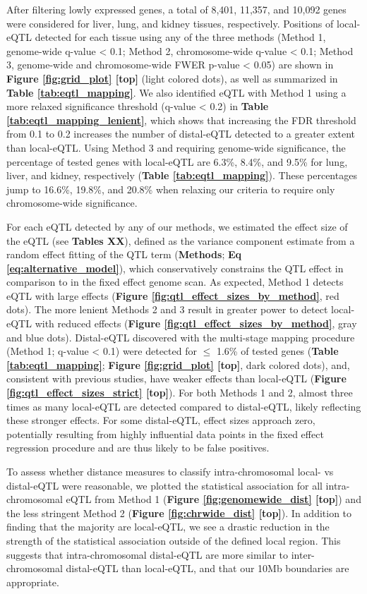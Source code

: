 After filtering lowly expressed genes, a total of 8,401, 11,357, and 10,092 genes were considered for liver, lung, and kidney tissues, respectively. Positions of local-eQTL detected for each tissue using any of the three methods (Method 1, genome-wide q-value < 0.1; Method 2, chromosome-wide q-value < 0.1; Method 3, genome-wide and chromosome-wide FWER p-value < 0.05)  are shown in \textbf{Figure \ref{fig:grid_plot} [top]} (light colored dots), as well as summarized in \textbf{Table \ref{tab:eqtl_mapping}}. We also identified eQTL with Method 1 using a more relaxed significance threshold (q-value < 0.2) in \textbf{Table \ref{tab:eqtl_mapping_lenient}}, which shows that increasing the FDR threshold from 0.1 to 0.2 increases the number of distal-eQTL detected to a greater extent than local-eQTL. Using Method 3 and requiring genome-wide significance, the percentage of tested genes with local-eQTL are 6.3\%, 8.4\%, and 9.5\% for lung, liver, and kidney, respectively (\textbf{Table \ref{tab:eqtl_mapping}}). These percentages jump to 16.6\%, 19.8\%, and 20.8\% when relaxing our criteria to require only chromosome-wide significance. 

For each eQTL detected by any of our methods, we estimated the effect size of the eQTL (see \textbf{Tables XX}), defined as the variance component estimate from a random effect fitting of the QTL term (\textbf{Methods}; \textbf{Eq \ref{eq:alternative_model}}), which conservatively constrains the QTL effect in comparison to in the fixed effect genome scan. As expected, Method 1 detects eQTL with large effects (\textbf{Figure \ref{fig:qtl_effect_sizes_by_method}}, red dots). The more lenient Methods 2 and 3 result in greater power to detect local-eQTL with reduced effects (\textbf{Figure \ref{fig:qtl_effect_sizes_by_method}}, gray and blue dots). Distal-eQTL discovered with the multi-stage mapping procedure (Method 1; q-value < 0.1) were detected for $\leq$ 1.6\% of tested genes (\textbf{Table \ref{tab:eqtl_mapping}}; \textbf{Figure \ref{fig:grid_plot} [top]}, dark colored dots), and, consistent with previous studies, have weaker effects than local-eQTL (\textbf{Figure \ref{fig:qtl_effect_sizes_strict} [top]}). For both Methods 1 and 2, almost three times as many local-eQTL are detected compared to distal-eQTL, likely reflecting these stronger effects. For some distal-eQTL, effect sizes approach zero, potentially resulting from highly influential data points in the fixed effect regression procedure and are thus likely to be false positives. 

To assess whether distance measures to classify intra-chromosomal local- vs distal-eQTL were reasonable, we plotted the statistical association for all intra-chromosomal eQTL from Method 1 (\textbf{Figure \ref{fig:genomewide_dist} [top]}) and the less stringent Method 2 (\textbf{Figure \ref{fig:chrwide_dist} [top]}). In addition to finding that the majority are local-eQTL, we see a drastic reduction in the strength of the statistical association outside of the defined local region. This suggests that intra-chromosomal distal-eQTL are more similar to inter-chromosomal distal-eQTL than local-eQTL, and that our 10Mb boundaries are appropriate. 

